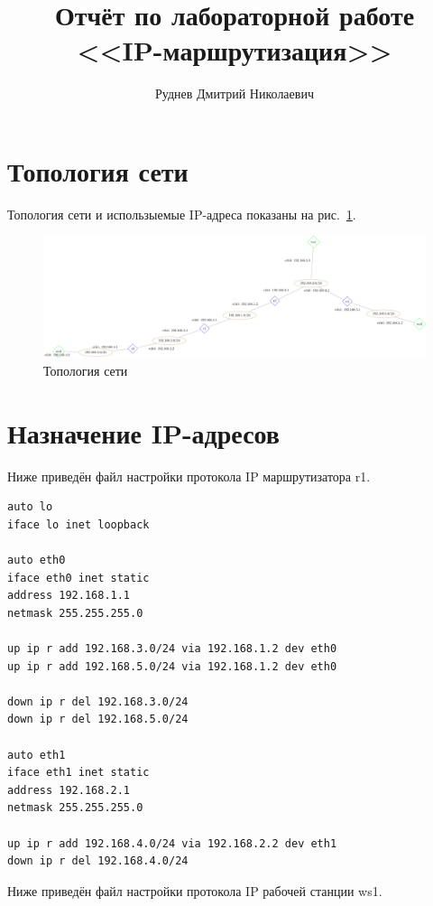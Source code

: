 \documentclass[a4paper,12pt]{article}
\title{Отчёт по лабораторной работе \\ <<IP-маршрутизация>>}
\author{Руднев Дмитрий Николаевич}
\begin{document}
\maketitle

\tableofcontents


\section{Топология сети}

Топология сети и использыемые IP-адреса показаны на рис.~\ref{fig:network}.

\begin{figure}
\centering
\includegraphics[width=\textwidth]{includes/network_gv.pdf}
\caption{Топология сети}
\label{fig:network}
\end{figure}


\section{Назначение IP-адресов}

Ниже приведён файл настройки протокола IP маршрутизатора r1.

\begin{Verbatim}
auto lo
iface lo inet loopback

auto eth0
iface eth0 inet static
address 192.168.1.1
netmask 255.255.255.0

up ip r add 192.168.3.0/24 via 192.168.1.2 dev eth0
up ip r add 192.168.5.0/24 via 192.168.1.2 dev eth0

down ip r del 192.168.3.0/24
down ip r del 192.168.5.0/24

auto eth1
iface eth1 inet static
address 192.168.2.1
netmask 255.255.255.0

up ip r add 192.168.4.0/24 via 192.168.2.2 dev eth1
down ip r del 192.168.4.0/24
\end{Verbatim}

Ниже приведён файл настройки протокола IP рабочей станции ws1.
\end{document}
